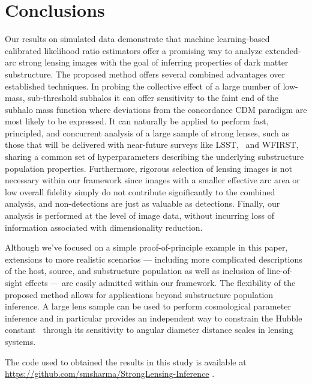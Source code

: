 \documentclass[twocolumn]{aastex62}
\begin{document}
\section{Conclusions}
\label{sec:conclusions}

Our results on simulated data demonstrate that machine learning-based calibrated likelihood ratio estimators offer a promising way to analyze extended-arc strong lensing images with the goal of inferring properties of dark matter substructure. The proposed method offers several combined advantages over established techniques. In probing the collective effect of a large number of low-mass, sub-threshold subhalos it can offer sensitivity to the faint end of the subhalo mass function where deviations from the concordance CDM paradigm are most likely to be expressed. It can naturally be applied to perform fast, principled, and concurrent analysis of a large sample of strong lenses, such as those that will be delivered with near-future surveys like LSST, \Euclid~and WFIRST, sharing a common set of hyperparameters describing the underlying substructure population properties. Furthermore, rigorous selection of lensing images is not necessary within our framework since images with a smaller effective arc area or low overall fidelity simply do not contribute significantly to the combined analysis, and non-detections are just as valuable as detections. Finally, our analysis is performed at the level of image data, without incurring loss of information associated with dimensionality reduction. 

Although we've focused on a simple proof-of-principle example in this paper, extensions to more realistic scenarios --- including more complicated descriptions of the host, source, and substructure population as well as inclusion of line-of-sight effects --- are easily admitted within our framework. The flexibility of the proposed method allows for applications beyond substructure population inference. A large lens sample can be used to perform cosmological parameter inference and in particular provides an independent way to constrain the Hubble constant~\citep{1907.04869,1907.02533} through its sensitivity to angular diameter distance scales in lensing systems.

The code used to obtained the results in this study is available at \url{https://github.com/smsharma/StrongLensing-Inference} \href{https://github.com/smsharma/StrongLensing-Inference}{\faGithub}.

\acknowledgements
\end{document}
